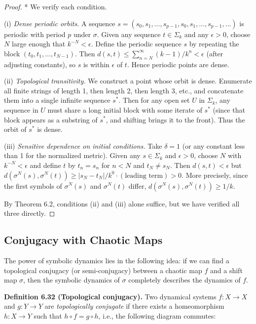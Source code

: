 \begin{proof}
* We verify each condition.

(i) \textit{Dense periodic orbits.} A sequence $s = (s_0, s_1, \ldots, s_{p-1}, s_0, s_1, \ldots, s_{p-1}, \ldots)$ is periodic with period $p$ under $\sigma$. Given any sequence $t \in \Sigma_k$ and any $\epsilon > 0$, choose $N$ large enough that $k^{-N} < \epsilon$. Define the periodic sequence $s$ by repeating the block $(t_0, t_1, \ldots, t_{N-1})$. Then $d(s, t) \leq \sum_{n=N}^{\infty} (k-1)/k^n < \epsilon$ (after adjusting constants), so $s$ is within $\epsilon$ of $t$. Hence periodic points are dense.

(ii) \textit{Topological transitivity.} We construct a point whose orbit is dense. Enumerate all finite strings of length 1, then length 2, then length 3, etc., and concatenate them into a single infinite sequence $s^*$. Then for any open set $U$ in $\Sigma_k$, any sequence in $U$ must share a long initial block with some iterate of $s^*$ (since that block appears as a substring of $s^*$, and shifting brings it to the front). Thus the orbit of $s^*$ is dense.

(iii) \textit{Sensitive dependence on initial conditions.} Take $\delta = 1$ (or any constant less than 1 for the normalized metric). Given any $s \in \Sigma_k$ and $\epsilon > 0$, choose $N$ with $k^{-N} < \epsilon$ and define $t$ by $t_n = s_n$ for $n < N$ and $t_N \neq s_N$. Then $d(s, t) < \epsilon$ but $d(\sigma^N(s), \sigma^N(t)) \geq |s_N - t_N|/k^0 \cdot (\text{leading term}) > 0$. More precisely, since the first symbols of $\sigma^N(s)$ and $\sigma^N(t)$ differ, $d(\sigma^N(s), \sigma^N(t)) \geq 1/k$.

By Theorem 6.2, conditions (ii) and (iii) alone suffice, but we have verified all three directly.
\end{proof}


\subsection{Conjugacy with Chaotic Maps}\label{sec:6.6.3}

The power of symbolic dynamics lies in the following idea: if we can find a topological conjugacy (or semi-conjugacy) between a chaotic map $f$ and a shift map $\sigma$, then the symbolic dynamics of $\sigma$ completely describes the dynamics of $f$.

\textbf{Definition 6.32 (Topological conjugacy).} Two dynamical systems $f: X \to X$ and $g: Y \to Y$ are \textit{topologically conjugate} if there exists a homeomorphism $h: X \to Y$ such that $h \circ f = g \circ h$, i.e., the following diagram commutes:

